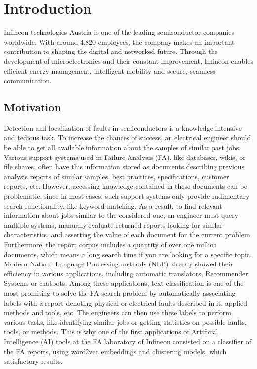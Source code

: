 \chapter{Introduction} \label{chapter:introduction}

Infineon technologies Austria is one of the leading semiconductor companies worldwide. With around 4,820 employees, the company makes an important contribution to shaping the digital and networked future. Through the development of microelectronics and their constant improvement, Infineon enables efficient energy management, intelligent mobility and secure, seamless communication. \newline

\section{Motivation}
Detection and localization of faults in semiconductors is a knowledge-intensive and tedious task. To increase the chances of success, an electrical engineer should be able to get all available information about the samples of similar past jobs. Various support systems used in Failure Analysis (FA), like databases, wikis, or file shares, often have this information stored as documents describing previous analysis reports of similar samples, best practices, specifications, customer reports, etc. However, accessing knowledge contained in these documents can be problematic, since in most cases, such support systems only provide rudimentary search functionality, like keyword matching. As a result, to find relevant information about jobs similar to the considered one, an engineer must query multiple systems, manually evaluate returned reports looking for similar characteristics, and asserting the value of each document for the current problem. Furthermore, the report corpus includes a quantity of over one million documents, which means a long search time if you are looking for a specific topic.\newline
Modern Natural Language Processing methods (NLP) already showed their efficiency in various applications, including automatic translators, Recommender Systems or chatbots. Among these applications, text classification is one of the most promising to solve the FA search problem by automatically associating labels with a report denoting physical or electrical faults described in it, applied methods and tools, etc. The engineers can then use these labels to perform various tasks, like identifying similar jobs or getting statistics on possible faults, tools, or methods. \newline
This is why one of the first applications of Artificial Intelligence (AI) tools at the FA laboratory of Infineon consisted on a classifier of the FA reports, using word2vec embeddings and clustering models, which satisfactory results. \newline

